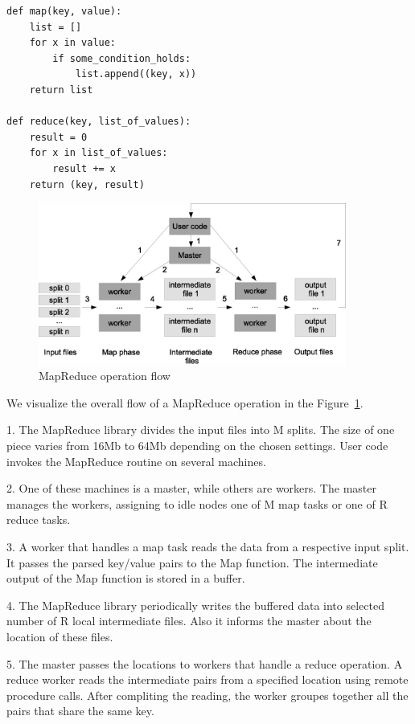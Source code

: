 \begin{lstlisting}[caption=Simple MapReduce task, label=lis:simple_mapreduce_task]
def map(key, value):
	list = []
	for x in value:
		if some_condition_holds:
	 		list.append((key, x))
	return list

def reduce(key, list_of_values):
	result = 0
	for x in list_of_values:
		result += x
	return (key, result)
\end{lstlisting}

\begin{figure}
  \centering
  \includegraphics [width=0.9\textwidth]{images/MapReduce_operation_flow}
  \caption{MapReduce operation flow}
  \label{fig:mapreduce_operation_flow}
\end{figure}

We visualize the overall flow of a MapReduce operation in the Figure~\ref{fig:mapreduce_operation_flow}.

1. The MapReduce library divides the input files into M splits.
The size of one piece varies from 16Mb to 64Mb depending on the chosen settings.
User code invokes the MapReduce routine on several machines.

2. One of these machines is a master, while others are workers.
The master manages the workers, assigning to idle nodes one of M map tasks or one of R reduce tasks.

3. A worker that handles a map task reads the data from a respective input split.
It passes the parsed key/value pairs to the Map function.
The intermediate output of the Map function is stored in a buffer.

4. The MapReduce library periodically writes the buffered data into selected number of R local intermediate files.
Also it informs the master about the location of these files.

5. The master passes the locations to workers that handle a reduce operation.
A reduce worker reads the intermediate pairs from a specified location using remote procedure calls.
After compliting the reading, the worker groupes together all the pairs that share the same key.

